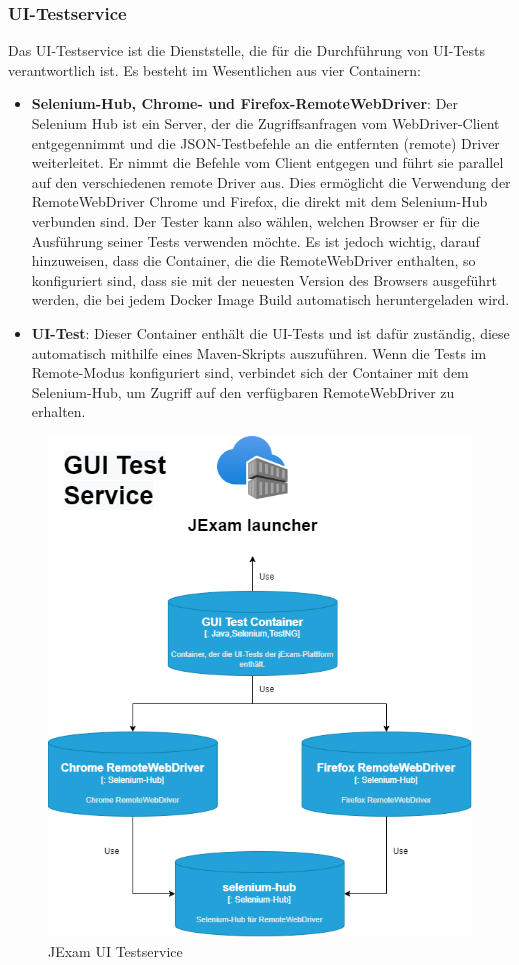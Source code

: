 \subsubsection{UI-Testservice}

Das UI-Testservice ist die Dienststelle, die für die Durchführung
von UI-Tests verantwortlich ist. Es besteht im Wesentlichen aus
vier Containern:

\begin{itemize}
    \setlength\itemsep{1em}

    \item[] \textbf{Selenium-Hub, Chrome- und Firefox-RemoteWebDriver}:
    Der Selenium Hub ist ein Server, der die Zugriffsanfragen vom 
    WebDriver-Client entgegennimmt und die JSON-Testbefehle an die 
    entfernten (remote) Driver weiterleitet. Er nimmt die Befehle vom 
    Client entgegen und führt sie parallel auf den verschiedenen 
    remote Driver aus. Dies ermöglicht die Verwendung der 
    RemoteWebDriver Chrome und Firefox, die direkt mit dem
    Selenium-Hub verbunden sind. Der Tester kann also wählen,
    welchen Browser er für die Ausführung seiner Tests verwenden
    möchte. Es ist jedoch wichtig, darauf hinzuweisen, dass die 
    Container, die die RemoteWebDriver enthalten, so konfiguriert 
    sind, dass sie mit der neuesten Version des Browsers ausgeführt 
    werden, die bei jedem Docker Image Build automatisch 
    heruntergeladen wird.

    \item[] \textbf{UI-Test}: Dieser Container enthält die UI-Tests
    und ist dafür zuständig, diese automatisch mithilfe eines
    Maven-Skripts auszuführen. Wenn die Tests im Remote-Modus
    konfiguriert sind, verbindet sich der Container mit dem
    Selenium-Hub, um Zugriff auf den verfügbaren RemoteWebDriver
    zu erhalten.
\end{itemize}

\begin{figure}[H]
    \centering
    \includegraphics[scale=0.6]{images/gui.drawio}
    \caption{JExam UI Testservice} \label{fig:ui}
\end{figure}